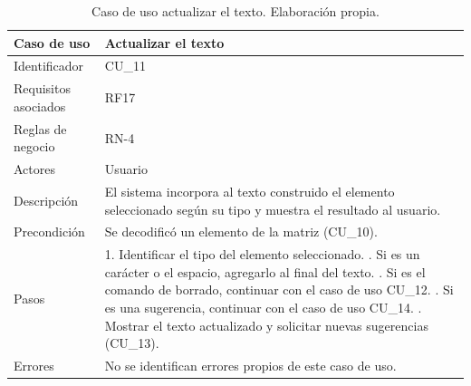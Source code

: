 \begin{table}[H]
\centering
\small
\begin{tabularx}{\textwidth}{|L{3.0cm}|Y|}
\hline
\textbf{Caso de uso} & \textbf{Actualizar el texto} \\
\hline
Identificador & CU\_11 \\
\hline
Requisitos asociados & RF17 \\
\hline
Reglas de negocio & RN-4 \\
\hline
Actores & Usuario \\
\hline
Descripción & El sistema incorpora al texto construido el elemento seleccionado según su tipo y muestra el resultado al usuario. \\
\hline
Precondición & Se decodificó un elemento de la matriz (CU\_10). \\
\hline
Pasos & 1. Identificar el tipo del elemento seleccionado. . Si es un carácter o el espacio, agregarlo al final del texto. . Si es el comando de borrado, continuar con el caso de uso CU\_12. . Si es una sugerencia, continuar con el caso de uso CU\_14. . Mostrar el texto actualizado y solicitar nuevas sugerencias (CU\_13). \\
\hline
Errores & No se identifican errores propios de este caso de uso. \\
\hline
\end{tabularx}
\caption{Caso de uso actualizar el texto. Elaboración propia.}
\label{tab:cu11}
\end{table}


